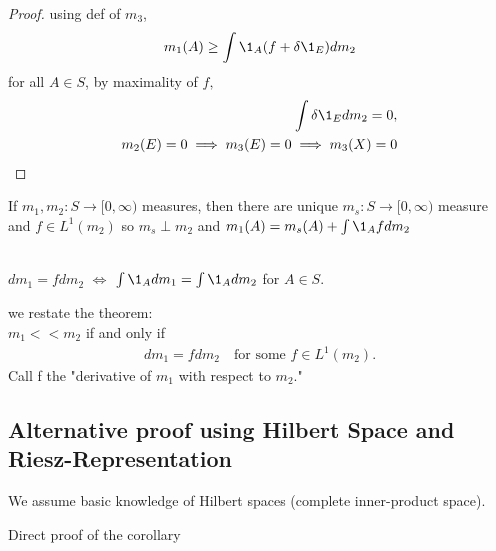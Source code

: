 \begin{proof}
	using def of $m_3$, 
	\begin{align*}
		m_1 (A) \geq \int \1_A (f + \delta \1_E ) d m_2
	\end{align*} 
	for all $A \in S$, by maximality of $f,$ 
	\begin{align*}
		\int \delta \1_E dm_2 = 0, \\
		m_2 (E) = 0 \implies m_3 (E) = 0 \implies m_3 (X) = 0
	\end{align*} 
\end{proof}



\begin{corollary}
	If $m_1, m_2 : S \to [0, \infty)$	 measures, then there are unique $m_s :S \to [0, \infty)$ measure and 
	$f \in L^{1} (m_2)$ so $m_s \perp m_2$ and $m_1 (A) = m_s (A) + \int \1_A f d m_2$
\end{corollary}

\begin{remark*}[Notation] \\
	$d m_1 = f dm_2$ $\iff $ $\int \1_A d m_1 = \int \1_A d m_2$ for $A \in S$.
\end{remark*}

\begin{theorem} we restate the theorem: \\
	$m_1 << m_2$ if and only if
	\begin{align*}
		d m_1 = f d m_2 \quad \text{for some } f \in L^1 (m_2) .
	\end{align*}
	Call f the "derivative of $m_1$ with respect to $m_2$."
\end{theorem}

\subsection{Alternative proof using Hilbert Space and Riesz-Representation}



We assume basic knowledge of Hilbert spaces (complete inner-product space).

Direct proof of the corollary

